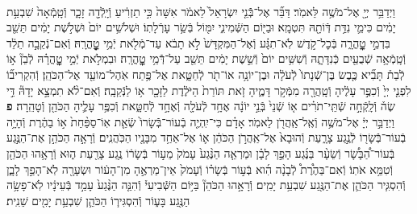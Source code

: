 \documentclass[twoside, openany, parskip=half, 11pt]{book}
\begin{document}
\begin{sometimes}
\begin{footnotesize}
\begin{multicols}{2}
\\
וַיְדַבֵּ֥ר יְיָ֖ אֶל־מֹשֶׁ֥ה לֵּאמֹֽר׃ דַּבֵּ֞ר אֶל־בְּֿֿנֵ֤י יִשְׂרָאֵל֙ לֵאמֹ֔ר אִשָּׁה֙ כִּ֣י תַזְרִ֔יעַ וְֿיָֽלְֿדָ֖ה זָכָ֑ר וְֿטָֽמְֿאָה֙ שִׁבְעַ֣ת יָמִ֔ים כִּימֵ֛י נִדַּ֥ת דְּֿוֹתָ֖הּ תִּטְמָֽא׃ וּבַיּ֖וֹם הַשְּֿׁמִינִ֑י יִמּ֖וֹל בְּֿשַׂ֥ר עָרְֿלָתֽוֹ׃ וּשְׁלֹשִׁ֥ים יוֹם֙ וּשְׁלֹ֣שֶׁת יָמִ֔ים תֵּשֵׁ֖ב בִּדְמֵ֣י טׇׇׇׇׇׇׇׇׇׇׇׇָֽהֳרָ֑ה בְּֿכׇל־קֹ֣דֶשׁ לֹֽא־תִגָּ֗ע וְֿאֶל־הַמִּקְדָּשׁ֙ לֹ֣א תָבֹ֔א עַד־מְֿלֹ֖את יְֿמֵ֥י טׇׇׇׇׇׇׇׇׇׇׇׇׇׇָֽהֳרָֽהּ׃  וְֿאִם־נְֿקֵבָ֣ה תֵלֵ֔ד וְֿטָֽמְֿאָ֥ה שְֿׁבֻעַ֖יִם כְּֿנִדָּתָ֑הּ וְֿשִׁשִּׁ֥ים יוֹם֙ וְֿשֵׁ֣שֶׁת יָמִ֔ים תֵּשֵׁ֖ב עַל־דְּֿֿמֵ֥י טׇׇׇׇׇׇׇׇׇׇׇׇׇׇָֽהֳרָֽה׃ וּבִמְלֹ֣את יְֿמֵ֣י טׇׇׇׇׇׇׇׇׇׇׇׇָֽהֳרָ֗הּ לְֿבֵן֘ א֣וֹ לְֿבַת֒ תָּבִ֞יא כֶּ֤בֶשׂ בֶּן־שְֿׁנָתוֹ֙ לְֿעֹלָ֔ה וּבֶן־יוֹנָ֥ה אוֹ־תֹ֖ר לְֿחַטָּ֑את אֶל־פֶּ֥תַח אֹֽהֶל־מוֹעֵ֖ד אֶל־הַכֹּהֵֽן׃ וְֿהִקְרִיב֞וֹ לִפְנֵ֤י יְיָ֙ וְֿכִפֶּ֣ר עָלֶ֔יהָ וְֿטָֽהֲרָ֖ה מִמְּֿקֹ֣ר דָּמֶ֑יהָ זֹ֤את תּוֹרַת֙ הַיֹּלֶ֔דֶת לַזָּכָ֖ר א֥וֹ לַנְּֿקֵבָֽה׃ וְֿאִם־לֹ֨א תִמְצָ֣א יָדָהּ֘ דֵּ֣י שֶׂה֒ וְֿלָֽקְֿחָ֣ה שְֿׁתֵּֽי־תֹרִ֗ים א֤וֹ שְֿׁנֵי֙ בְּֿנֵ֣י יוֹנָ֔ה אֶחָ֥ד לְֿעֹלָ֖ה וְֿאֶחָ֣ד לְֿחַטָּ֑את וְֿכִפֶּ֥ר עָלֶ֛יהָ הַכֹּהֵ֖ן וְֿטָהֵֽרָה׃ \textbf{פ}
וַיְדַבֵּ֣ר יְיָ֔ אֶל־מֹשֶׁ֥ה וְֿאֶֽל־אַֽהֲרֹ֖ן לֵאמֹֽר׃ אָדָ֗ם כִּי־יִֽהְיֶ֤ה בְֿעוֹר־בְּֿֿשָׂרוֹ֙ שְֿׂאֵ֤ת אֽוֹ־סַפַּ֨חַת֙ א֣וֹ בַהֶ֔רֶת וְֿהָיָ֥ה בְֿעוֹר־בְּֿֿשָׂר֖וֹ לְֿנֶ֣גַע צָרָ֑עַת וְֿהוּבָא֙ אֶל־אַֽהֲרֹ֣ן הַכֹּהֵ֔ן א֛וֹ אֶל־אַחַ֥ד מִבָּנָ֖יו הַכֹּֽהֲנִֽים׃ וְֿרָאָ֣ה הַכֹּהֵ֣ן אֶת־הַנֶּ֣גַע בְּֿעוֹר־הַ֠בָּשָׂ֠ר וְֿשֵׂעָ֨ר בַּנֶּ֜גַע הָפַ֣ךְ לָבָ֗ן וּמַרְאֵ֤ה הַנֶּ֨גַע֙ עָמֹק֙ מֵע֣וֹר בְּֿשָׂר֔וֹ נֶ֥גַע צָרַ֖עַת ה֑וּא וְֿרָאָ֥הוּ הַכֹּהֵ֖ן וְֿטִמֵּ֥א אֹתֽוֹ׃ וְֿאִם־בַּהֶ֩רֶת֩ לְֿבָנָ֨ה הִ֜וא בְּֿע֣וֹר בְּֿשָׂר֗וֹ וְֿעָמֹק֙ אֵין־מַרְאֶ֣הָ מִן־הָע֔וֹר וּשְׂעָרָ֖ה לֹֽא־הָפַ֣ךְ לָבָ֑ן וְֿהִסְגִּ֧יר הַכֹּהֵ֛ן אֶת־הַנֶּ֖גַע שִׁבְעַ֥ת יָמִֽים׃ וְֿרָאָ֣הוּ הַכֹּהֵן֘ בַּיּ֣וֹם הַשְּֿׁבִיעִי֒ וְֿהִנֵּ֤ה הַנֶּ֨גַע֙ עָמַ֣ד בְּֿעֵינָ֔יו לֹֽא־פָשָׂ֥ה הַנֶּ֖גַע בָּע֑וֹר וְֿהִסְגִּיר֧וֹ הַכֹּהֵ֛ן שִׁבְעַ֥ת יָמִ֖ים שֵׁנִֽית׃


\end{multicols}
\end{footnotesize}
\end{sometimes}
\end{document}
